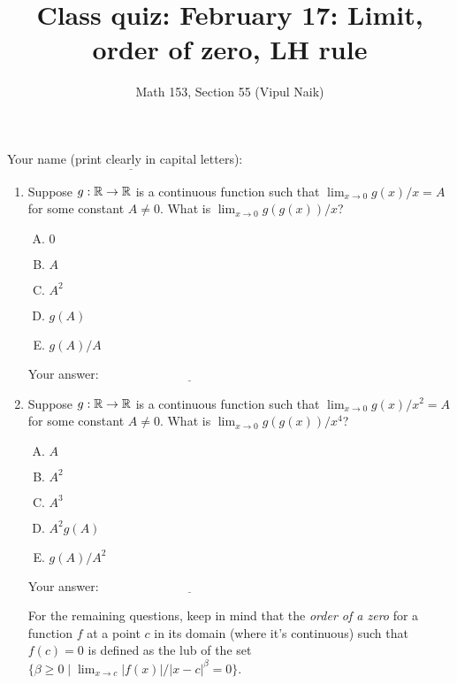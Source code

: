 \documentclass[10pt]{amsart}
\title{Class quiz: February 17: Limit, order of zero, LH rule}
\author{Math 153, Section 55 (Vipul Naik)}
\begin{document}
\maketitle

Your name (print clearly in capital letters): $\underline{\qquad\qquad\qquad\qquad\qquad\qquad\qquad\qquad\qquad\qquad}$

\begin{enumerate}

\item Suppose $g:\mathbb{R} \to \mathbb{R}$ is a continuous function such that
  $\lim_{x \to 0} g(x)/x = A$ for some constant $A \ne 0$. What is
  $\lim_{x \to 0} g(g(x))/x$? 

  \begin{enumerate}[(A)]
  \item $0$
  \item $A$
  \item $A^2$
  \item $g(A)$
  \item $g(A)/A$
  \end{enumerate}

  \vspace{0.1in}
  Your answer: $\underline{\qquad\qquad\qquad\qquad\qquad\qquad\qquad}$
  \vspace{0.15in}

\item Suppose $g:\mathbb{R} \to \mathbb{R}$ is a continuous function such that
  $\lim_{x \to 0} g(x)/x^2 = A$ for some constant $A \ne 0$. What is
  $\lim_{x \to 0} g(g(x))/x^4$? 

  \begin{enumerate}[(A)]
  \item $A$
  \item $A^2$
  \item $A^3$
  \item $A^2g(A)$
  \item $g(A)/A^2$
  \end{enumerate}

  \vspace{0.1in}
  Your answer: $\underline{\qquad\qquad\qquad\qquad\qquad\qquad\qquad}$
  \vspace{0.15in}

  For the remaining questions, keep in mind that the {\em order of a
  zero} for a function $f$ at a point $c$ in its domain (where it's
  continuous) such that $f(c) = 0$ is defined as the lub of the set $\{
  \beta \ge 0 \mid \lim_{x \to c} |f(x)|/|x - c|^\beta = 0 \}$.


\end{enumerate}
\end{document}
